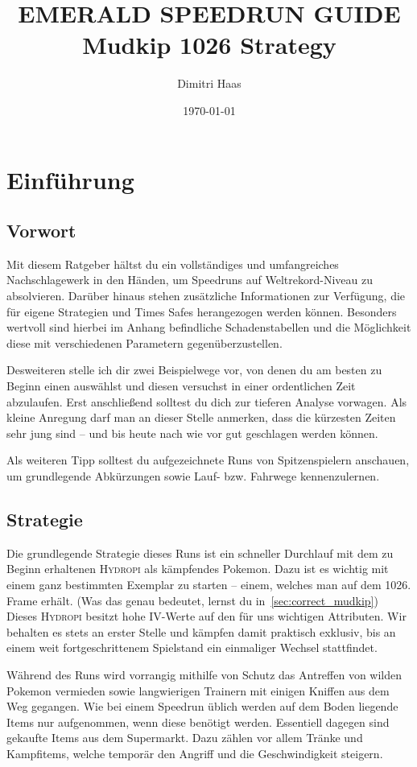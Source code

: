 \documentclass[11pt,a4paper,titlepage]{article}
\title{\blue EMERALD SPEEDRUN GUIDE \\
\blueb Mudkip 1026 Strategy}
\author{Dimitri Haas}
\date{\today}
\begin{document}
\maketitle

\section{Einführung}
\subsection{Vorwort}
\label{sec:preface}
Mit diesem Ratgeber hältst du ein vollständiges und umfangreiches Nachschlagewerk in den Händen, um Speedruns auf Weltrekord-Niveau zu absolvieren.
Darüber hinaus stehen zusätzliche Informationen zur Verfügung, die für eigene Strategien und Times Safes herangezogen werden können. Besonders wertvoll sind hierbei im Anhang befindliche Schadenstabellen und die Möglichkeit diese mit verschiedenen Parametern gegenüberzustellen. 

Desweiteren stelle ich dir zwei Beispielwege vor, von denen du am besten zu Beginn einen auswählst und diesen versuchst in einer ordentlichen Zeit abzulaufen. Erst anschließend solltest du dich zur tieferen Analyse vorwagen.
Als kleine Anregung darf man an dieser Stelle anmerken, dass die kürzesten Zeiten sehr jung sind – und bis heute nach wie vor gut geschlagen werden können.

Als weiteren Tipp solltest du aufgezeichnete Runs von Spitzenspielern anschauen, um grundlegende Abkürzungen sowie Lauf- bzw. Fahrwege kennenzulernen.%

\subsection{Strategie}
\label{sec:strategy_explanation}
Die grundlegende Strategie dieses Runs ist ein schneller Durchlauf mit dem zu Beginn erhaltenen \textsc{Hydropi} als kämpfendes Pokemon. Dazu ist es wichtig mit einem ganz bestimmten Exemplar zu starten -- einem, welches man auf dem 1026. Frame erhält. (Was das genau bedeutet, lernst du in~\ref{sec:correct_mudkip}) Dieses \textsc{Hydropi} besitzt hohe IV-Werte auf den für uns wichtigen Attributen. Wir behalten es stets an erster Stelle und kämpfen damit praktisch exklusiv, bis an einem weit fortgeschrittenem Spielstand ein einmaliger Wechsel stattfindet.

Während des Runs wird vorrangig mithilfe von Schutz das Antreffen von wilden Pokemon vermieden sowie langwierigen Trainern mit einigen Kniffen aus dem Weg gegangen. Wie bei einem Speedrun üblich werden auf dem Boden liegende Items nur aufgenommen, wenn diese benötigt werden. Essentiell dagegen sind gekaufte Items aus dem Supermarkt. Dazu zählen vor allem Tränke und Kampfitems, welche temporär den Angriff und die Geschwindigkeit steigern.
\end{document}
